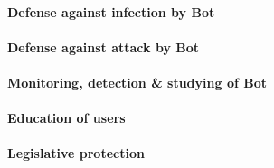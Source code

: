 


\paragraph{Defense against infection by Bot}



\paragraph{Defense against attack by Bot}



\paragraph{Monitoring, detection & studying of Bot}


\paragraph{Education of users}


\paragraph{Legislative protection}